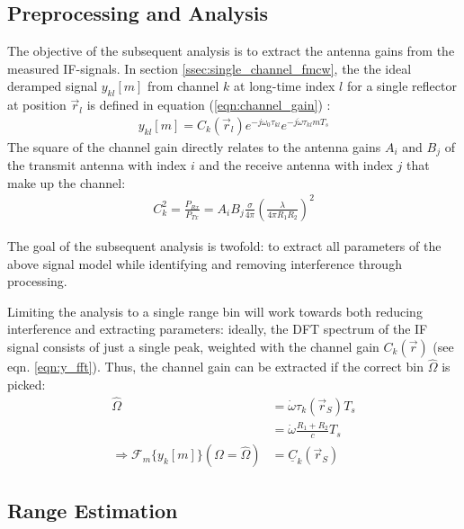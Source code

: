 \subsection{Preprocessing and Analysis}
The objective of the subsequent analysis is to extract the antenna gains from the measured IF-signals.
In section \ref{ssec:single_channel_fmcw}, 
the the ideal deramped signal $y_{kl}[m]$ from channel $k$ at long-time index $l$
for a single reflector at position $\vec r_l$
is defined in equation (\ref{eqn:channel_gain}) :
\begin{align*}
    y_{kl}[m] =  C_k(\vec r_l)e^{-j\omega_0\tau_{kl}}e^{-j\dot\omega\tau_{kl}mT_s}
\end{align*}
The square of the channel gain directly relates to the antenna gains $A_i$ and $B_j$ 
of the transmit antenna with index $i$ and the receive antenna with index $j$ that make up the channel:
\begin{align*}
    C_k^2 = \frac{P_{Rx}}{P_{Tx}} 
    =  A_i B_j \frac{\sigma}{4\pi} \left(\frac{\lambda}{4\pi R_1 R_2}\right)^2
\end{align*}



The goal of the subsequent analysis is twofold:
to extract all parameters of the above signal model while identifying and removing interference through processing.

Limiting the analysis to a single range bin will work towards both reducing interference and extracting parameters:
ideally, the DFT spectrum of the IF signal consists of just a single peak,
weighted with the channel gain $C_k(\vec r)$ (see eqn. \ref{eqn:y_fft}).
Thus, the channel gain can be extracted if the correct bin $\hat \Omega$ is picked:
\begin{align}
    \hat \Omega                                               & = \dot \omega \tau_k(\vec r_S)T_s    \\
                                                              & = \dot \omega \frac{R_1+R_2}{c}T_s      \\
    \Rightarrow \mathcal{F}_m\{y_k[m]\}(\Omega = \hat \Omega) & =    \underline C_k(\vec r_S) \label{eqn:G_fft}
\end{align}

\subsection{Range Estimation}
\label{ssec:range_est}

